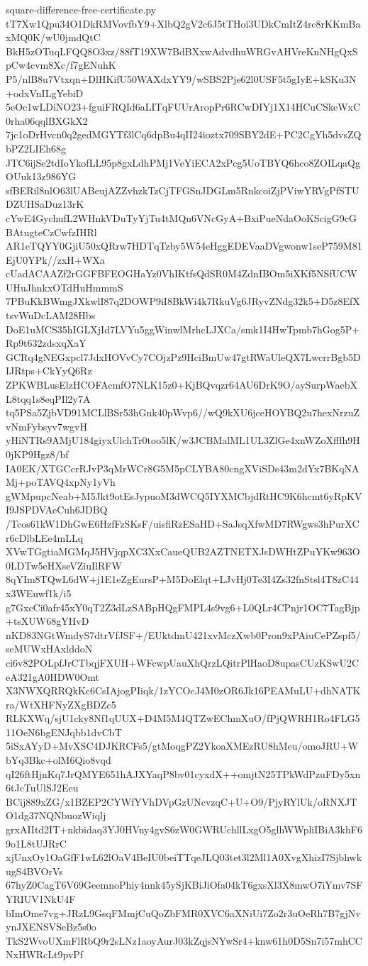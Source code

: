 \documentclass[11pt]{article}
\theoremstyle{definition}
\theoremstyle{remark}
\begin{document}
\begin{filecontents*}[overwrite]{square-difference-free-certificate.py}
tT7Xw1Qpu34O1DkRMVovfbY9+XlbQ2gV2c6J5tTHoi3UDkCmItZ4rc8rKKmBaxMQ0K/wU0jmdQtC
BkH5zOTuqLFQQ8O3xz/88fT19XW7BdBXxwAdvdhuWRGvAHVreKnNHgQxSpCw4cvm8Xc/f7gENuhK
P5/nlB8u7Vtxqn+DlHKifU50WAXdxYY9/wSBS2Pje62l0USF5t5gIyE+kSKu3N+odxVnILgYebiD
5eOc1wLDiNO23+fguiFRQId6aLITqFUUrAropPr6RCwDIYj1X14HCuCSkeWxC0rha06qqlBXGkX2
7jc1oDrHvcn0q2gedMGYTf3lCq6dpBu4qII24ioztx709SBY2dE+PC2CgYh5dvsZQbPZ2LIEh68g
JTC6ijSe2tdIoYkofLL95p8gxLdhPMj1VeYiECA2xPcg5UoTBYQ6hco8ZOILqaQgOUuk13z986YG
sfBERil8nlO63lUABeujAZZvhzkTzCjTFGSnJDGLm5RnkcoiZjPViwYRVgPfSTUDZUHSaDuz13rK
cYwE4GychufL2WHnkVDuTyYjTu4tMQn6VNcGyA+BxiPueNdaOoKScigG9cGBAtugteCzCwfzIHRl
AR1eTQYY0GjiU50xQRrw7HDTqTzby5W54eHggEDEVaaDVgwonw1seP759M81EjU0YPk//zxH+WXa
cUadACAAZf2rGGFBFEOGHaYz0VhIKtfsQdSR0M4ZdnIBOm5iXKf5NSfUCWUHuJhnkxOTdHuHmmmS
7PBuKkBWmgJXkwlI87q2DOWP9iI8BkWi4k7RkuVg6JRyvZNdg32k5+D5z8EfXtsvWuDcLAM28Hbs
DoE1uMCS35hIGLXjId7LVYu5ggWinwlMrhcLJXCa/smk1I4HwTpmb7hGog5P+Rp9t632zdsxqXaY
GCRq4gNEGxpcl7JdxHOVvCy7COjzPz9HciBmUw47gtRWaUleQX7LwcrrBgb5DIJRtps+CkYyQ6Rz
ZPKWBLusElzHCOFAcmfO7NLK15z0+KjBQvqzr64AU6DrK9O/aySurpWaebXL8tqq1s8eqPIl2y7A
tq5PSa5ZjbVD91MCLlBSr53hGnk40pWvp6//wQ9kXU6jceHOYBQ2u7hexNrzuZvNmFybsyv7wgvH
yHiNTRs9AMjU184giyxUlchTr0too5lK/w3JCBMalML1UL3ZlGe4xnWZoXfffh9H0jKP9Hgz8/bf
IA0EK/XTGCcrRJvP3qMrWCr8G5M5pCLYBA80cngXViSDs43m2dYx7BKqNAMj+poTAVQ4xpNy1yVh
gWMpupcNeab+M5Jkt9otEsJypuoM3dWCQ5IYXMCbjdRtHC9K6hcmt6yRpKVI9JSPDVAeCuh6JDBQ
/Tcos61kW1DhGwE6HzfFzSKsF/uisfiRzESaHD+SaJsqXfwMD7RWgws3hPurXCr6cDlbLEe4mLLq
XVwTGgtiaMGMqJ5HVjqpXC3XxCaueQUB2AZTNETXJsDWHtZPuYKw963O0LDTw5eHXseVZiuIlRFW
8qYIm8TQwL6dW+j1E1eZgEursP+M5DoElqt+LJvHj0Te3I4Zs32fnStsl4T8zC44x3WEuwf1k/i5
g7GxcCi0afr45xY0qT2Z3dLzSABpHQgFMPL4s9vg6+L0QLr4CPnjr1OC7TagBjp+tsXUW68gYHvD
nKD83NGtWmdyS7dtrVfJSF+/EUktdmU421xvMczXwb0Pron9xPAiuCePZspf5/seMUWxHAxlddoN
ci6v82POLpfJrCTbqjFXUH+WFcwpUauXhQrzLQitrPlHaoD8upasCUzKSwU2CeA321gA0HDW0Omt
X3NWXQRRQkKc6CsIAjogPIiqk/1zYCOcJ4M0zOR6Jk16PEAMuLU+dhNATKra/WtXHFNyZXgBDZc5
RLKXWq/sjU1cky8Nf1qUUX+D4M5M4QTZwEChmXuO/fPjQWRH1Ro4FLG511OeN6bgENJqbb1dvCbT
5iSxAYyD+MvXSC4DJKRCFs5/gtMoqgPZ2YkoaXMEzRU8hMeu/omoJRU+WbYq3Bkc+olM6Qio8vqd
qI26ftHjnKq7JrQMYE651hAJXYaqP8bv01cyxdX++omjtN25TPkWdPzuFDy5xn6tJcTuUlSJ2Eeu
BCij889xZG/x1BZEP2CYWfYVhDVpGzUNcvzqC+U+O9/PjyRYlUk/oRNXJTO1dg37NQNbuozWiqlj
grxAIItd2IT+nkbidaq3YJ0HVny4gvS6zW0GWRUchllLxgO5glhWWpliIBiA3khF69o1L8tUJRrC
xjUnxOy1OaGfF1wL62lOaV4BeIU0beiTTqeJLQ03tet3l2Ml1A0XvgXhizI7SjbhwkugS4BVOrVs
67hyZ0CagT6V69GeemnoPhiy4nnk45ySjKBiJiOfa04kT6gxsXl3X8mwO7iYmv7SFYRIUV1NkU4F
bImOme7vg+JRzL9GsqFMmjCuQoZbFMR0XVC6aXNiUi7Zo2r3uOeRh7B7gjNvynJXENSVSeBz5s0o
TkS2WvoUXmFlRbQ9r2sLNz1aoyAurJ03kZqjsNYwSr4+knw61h0D5Sn7i57mhCCNxHWRcLt9pvPf

\end{filecontents*}
\end{document}
